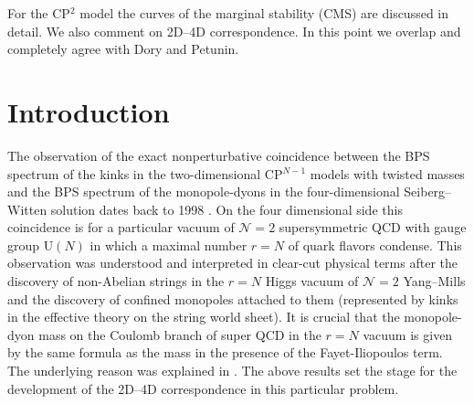 \documentclass[epsfig,12pt]{article}
\begin{document}
\begin{titlepage}
	For the CP$^2$ model the curves of the marginal stability (CMS) are discussed in detail.
	We also comment on 2D--4D correspondence. In this point we overlap and completely agree with Dory and Petunin.
	

\hspace{0.3cm}


\end{titlepage}

\newpage

\tableofcontents

\newpage

\section{Introduction}
\setcounter{equation}{0}

	The observation of the exact nonperturbative coincidence between the BPS spectrum
	of the kinks in the two-dimensional CP$^{N-1}$ models with twisted masses and the BPS spectrum of the monopole-dyons
	in the four-dimensional Seiberg--Witten solution 
\cite{SeibergWitten}
	dates back to 1998 
\cite{Dorey:1998yh}. On the four dimensional side this coincidence is for a particular vacuum of ${\mathcal N}=2$
supersymmetric QCD with gauge group U$(N)$ in which a maximal number $r=N$ of quark flavors condense.
	This observation was understood and interpreted in clear-cut physical terms after the discovery of non-Abelian strings 
	\cite{1,2} in the $r=N$ Higgs vacuum of ${\mathcal N}=2$ Yang--Mills and the discovery of confined monopoles attached to them 
\cite{Shifman:2004dr,4} 
	(represented by kinks in the effective theory on the string world sheet). 
	It is crucial that the monopole-dyon mass  on the Coulomb branch of super QCD in the $r=N$ vacuum is given by the same formula  
	as the mass in the presence of  the  Fayet-Iliopoulos term.
	The underlying reason was explained in 
\cite{Shifman:2004dr,4}. 
	The above results  set the stage for the development of the 2D--4D correspondence in this particular problem.
\end{document}
